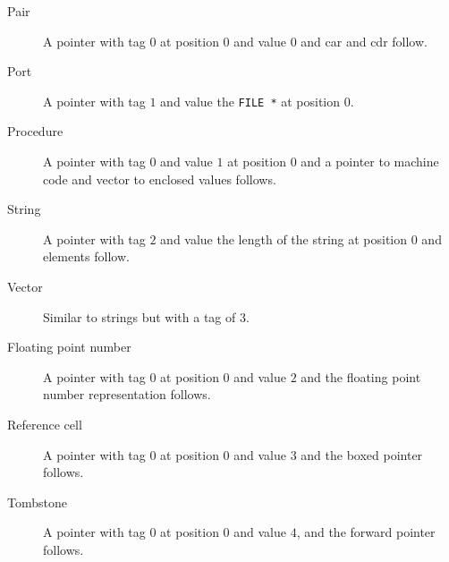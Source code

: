 \documentclass{article}
\begin{document}
\begin{description}
\item[Pair] A pointer with tag $0$ at position $0$ and value $0$ and car and cdr
  follow.
\item[Port] A pointer with tag $1$ and value the \verb|FILE *| at
  position $0$.
\item[Procedure] A pointer with tag $0$ and value $1$ at position $0$ and a pointer to machine code and vector to enclosed values follows.
\item[String] A pointer with tag $2$ and value the length of the
  string at position $0$ and elements follow.
\item[Vector] Similar to strings but with a tag of $3$.
\item[Floating point number] A pointer with tag $0$ at position $0$ and value $2$
  and the floating point number representation follows.
\item[Reference cell] A pointer with tag $0$ at position $0$ and value $3$ and
  the boxed pointer follows.
\item[Tombstone] A pointer with tag $0$ at position $0$ and value $4$,
  and the forward pointer follows.
\end{description}
\end{document}
